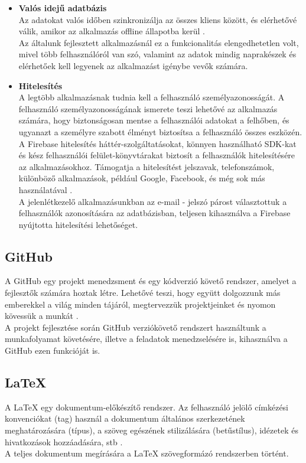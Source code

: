 \documentclass[12pt]{article}
\numberwithin{figure}{section}
\numberwithin{equation}{section}
\begin{document}
\begin{itemize}
	\item \textbf{Valós idejű adatbázis}\\
	Az adatokat valós időben szinkronizálja az összes kliens között, és elérhetővé válik, amikor az alkalmazás offline állapotba kerül \cite{12}. \\
	Az általunk fejlesztett alkalmazásnál ez a funkcionalitás elengedhetetlen volt, mivel több felhasználóról van szó, valamint az adatok mindig naprakészek és elérhetőek kell legyenek az alkalmazást igénybe vevők számára.\\
	
	\item \textbf{Hitelesítés}\\
	A legtöbb alkalmazásnak tudnia kell a felhasználó személyazonosságát. A felhasználó személyazonosságának ismerete teszi lehetővé az alkalmazás számára, hogy biztonságosan mentse a felhasználói adatokat a felhőben, és ugyanazt a személyre szabott élményt biztosítsa a felhasználó összes eszközén.\\
	A Firebase hitelesítés háttér-szolgáltatásokat, könnyen használható SDK-kat és kész felhasználói felület-könyvtárakat biztosít a felhasználók hitelesítésére az alkalmazásokhoz. Támogatja a hitelesítést jelszavak, telefonszámok, különböző alkalmazások, például Google, Facebook, és még sok más használatával \cite{13}.\\
	A jelenlétkezelő alkalmazásunkban az e-mail - jelszó párost választottuk a felhasználók azonosítására az adatbázisban, teljesen kihasználva a Firebase nyújtotta hitelesítési lehetőséget.
\end{itemize}

\subsection{GitHub}
A GitHub egy projekt menedzsment és egy kódverzió követő rendszer, amelyet a fejlesztők számára hoztak létre. Lehetővé teszi, hogy együtt dolgozzunk más emberekkel a világ minden tájáról, megtervezzük projektjeinket és nyomon kövessük a munkát \cite{14}.\\
A projekt fejlesztése során GitHub verziókövető rendszert használtunk a munkafolyamat követésére, illetve a feladatok menedzselésére is, kihasználva a GitHub ezen funkcióját is.

\subsection{LaTeX}
A LaTeX egy dokumentum-előkészítő rendszer. Az felhasználó jelölő címkézési konvenciókat (tag) használ a dokumentum általános szerkezetének meghatározására (típus), a szöveg egészének stilizálására (betűstílus), idézetek és hivatkozások hozzáadására, stb \cite{15}.\\
A teljes dokumentum megírására a LaTeX szövegformázó rendszerben történt.
\end{document}

